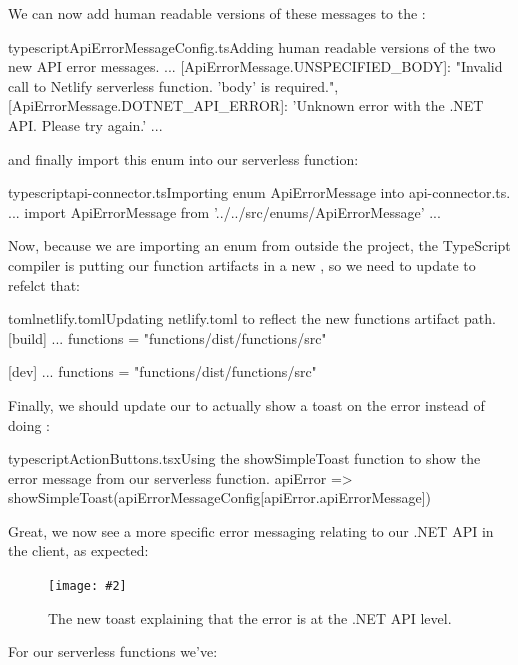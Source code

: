 \documentclass[a4paper,headinclude=on,footinclude=on,12pt,oneside]{scrbook}
\newcommand{\standardfigure}[3]{\begin{figure}[H]\begin{center}\texttt{[image: \#2]}\caption{#3}\label{fig:#2}\end{center}\end{figure}}
\begin{document}
We can now add human readable versions of these messages to the :

\begin{codeInput}{typescript}{ApiErrorMessageConfig.ts}{Adding human readable versions of the two new API error messages.}
...
[ApiErrorMessage.UNSPECIFIED_BODY]: "Invalid call to Netlify serverless function. 'body' is required.",
[ApiErrorMessage.DOTNET_API_ERROR]: 'Unknown error with the .NET API. Please try again.'
...
\end{codeInput}

and finally import this enum into our serverless function:

\begin{codeInput}{typescript}{api-connector.ts}{Importing enum ApiErrorMessage into api-connector.ts.}
...
import ApiErrorMessage from '../../src/enums/ApiErrorMessage'
...
\end{codeInput}

Now, because we are importing an enum from outside the project, the TypeScript compiler is putting our function artifacts in a new , so we need to update  to refelct that:

\begin{codeInput}{toml}{netlify.toml}{Updating netlify.toml to reflect the new functions artifact path.}
[build]
  ...
  functions = "functions/dist/functions/src"
  
[dev]
  ...
  functions = "functions/dist/functions/src"
\end{codeInput}

Finally, we should update our  to actually show a toast on the error instead of doing :

\begin{codeInput}{typescript}{ActionButtons.tsx}{Using the showSimpleToast function to show the error message from our serverless function.}
apiError => {
  showSimpleToast(apiErrorMessageConfig[apiError.apiErrorMessage])
}
\end{codeInput}

Great, we now see a more specific error messaging relating to our .NET API in the client, as expected:

\standardfigure{\textwidth}{frontend/new-toast-message}{The new toast explaining that the error is at the .NET API level.}


For our serverless functions we've:
\end{document}
